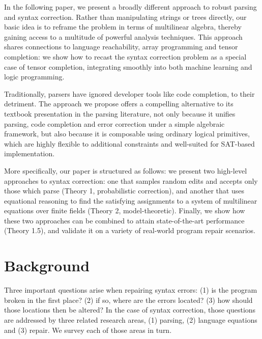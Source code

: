 \documentclass[sigplan,review,anonymous,acmsmall]{acmart}\settopmatter{printfolios=false,printccs=false,printacmref=false}
\begin{document}
In the following paper, we present a broadly different approach to robust parsing and syntax correction. Rather than manipulating strings or trees directly, our basic idea is to reframe the problem in terms of multilinear algebra, thereby gaining access to a multitude of powerful analysis techniques. This approach shares connections to language reachability, array programming and tensor completion: we show how to recast the syntax correction problem as a special case of tensor completion, integrating smoothly into both machine learning and logic programming.

Traditionally, parsers have ignored developer tools like code completion, to their detriment. The approach we propose offers a compelling alternative to its textbook presentation in the parsing literature, not only because it unifies parsing, code completion and error correction under a simple algebraic framework, but also because it is composable using ordinary logical primitives, which are highly flexible to additional constraints and well-suited for SAT-based implementation.

More specifically, our paper is structured as follows: we present two high-level approaches to syntax correction: one that samples random edits and accepts only those which parse (Theory 1, probabilistic correction), and another that uses equational reasoning to find the satisfying assignments to a system of multilinear equations over finite fields (Theory 2, model-theoretic). Finally, we show how these two approaches can be combined to attain state-of-the-art performance (Theory 1.5), and validate it on a variety of real-world program repair scenarios.

\section{Background}


Three important questions arise when repairing syntax errors: (1) is the program broken in the first place? (2) if so, where are the errors located? (3) how should those locations then be altered? In the case of syntax correction, those questions are addressed by three related research areas, (1) parsing, (2) language equations and (3) repair. We survey each of those areas in turn.
\end{document}
